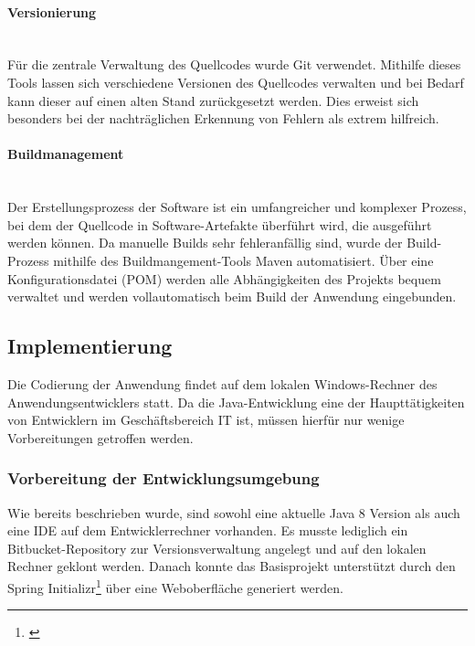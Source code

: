 \paragraph{Versionierung} ~\\
\label{p:Versionierung}
Für die zentrale Verwaltung des Quellcodes wurde Git verwendet. Mithilfe dieses Tools lassen sich verschiedene Versionen des Quellcodes verwalten und bei Bedarf kann dieser auf einen alten Stand zurückgesetzt werden. Dies erweist sich besonders bei der nachträglichen Erkennung von Fehlern als extrem hilfreich.

\paragraph{Buildmanagement} ~\\
\label{p:Buildmangement}
Der Erstellungsprozess der Software ist ein umfangreicher und komplexer Prozess, bei dem der Quellcode in Software-Artefakte überführt wird, die ausgeführt werden können. Da manuelle Builds sehr fehleranfällig sind, wurde der Build-Prozess mithilfe des Buildmangement-Tools Maven automatisiert. Über eine Konfigurationsdatei (\ac{POM}) werden alle Abhängigkeiten des Projekts bequem verwaltet und werden vollautomatisch beim Build der Anwendung eingebunden.


\subsection{Implementierung} 
\label{sec:Implementierung}
Die Codierung der Anwendung findet auf dem lokalen Windows-Rechner des Anwendungsentwicklers statt. Da die Java-Entwicklung eine der Haupttätigkeiten von Entwicklern im Geschäftsbereich IT ist, müssen hierfür nur wenige Vorbereitungen getroffen werden.

\subsubsection{Vorbereitung der Entwicklungsumgebung}
\label{sec:Entwicklungsumgebung}
Wie bereits beschrieben wurde, sind sowohl eine aktuelle Java 8 Version als auch eine \ac{IDE} auf dem Entwicklerrechner vorhanden. Es musste lediglich ein Bitbucket-Repository zur Versionsverwaltung angelegt und auf den lokalen Rechner geklont werden. Danach konnte das Basisprojekt unterstützt durch den Spring Initializr\footnote{\cite{spring:init}} über eine Weboberfläche generiert werden.

